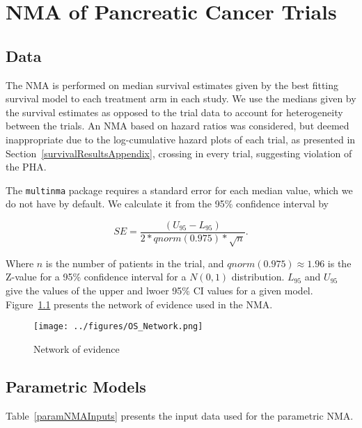 \chapter{NMA of Pancreatic Cancer Trials}

\section{Data}

The NMA is performed on median survival estimates given by the best fitting survival model to each treatment arm in each study. We use the medians given by the survival estimates as opposed to the trial data to account for heterogeneity between the trials. An NMA based on hazard ratios was considered, but deemed inappropriate due to the log-cumulative hazard plots of each trial, as presented in Section~\ref{survivalResultsAppendix}, crossing in every trial, suggesting violation of the PHA.

The \verb|multinma| package requires a standard error for each median value, which we do not have by default. We calculate it from the 95\% confidence interval by 

\[
    SE = \frac{(U_{95}-L_{95})}{2*qnorm(0.975)*\sqrt{n}}.
\]

Where $n$ is the number of patients in the trial, and $qnorm(0.975) \approx 1.96$ is the Z-value for a 95\% confidence interval for a $N(0, 1)$ distribution. $L_{95}$ and $U_{95}$ give the values of the upper and lwoer 95\% CI values for a given model. Figure~\ref{fig:OS_net} presents the network of evidence used in the NMA. 

\begin{figure}[h]
    \centering
    \texttt{[image: ../figures/OS\_Network.png]}
    \caption{Network of evidence}
    \label{fig:OS_net}
\end{figure}

\section{Parametric Models}

Table~\ref{paramNMAInputs} presents the input data used for the parametric NMA. 

